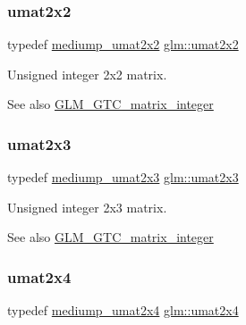 \subsubsection{\texorpdfstring{umat2x2}{umat2x2}}
{\footnotesize\ttfamily typedef \hyperlink{group__gtc__matrix__integer_ga539a528818569c17e68e77afce7755c2}{mediump\+\_\+umat2x2} \hyperlink{group__gtc__matrix__integer_gad3c997b31dd69bdb4787867e758ed48d}{glm\+::umat2x2}}

Unsigned integer 2x2 matrix. \begin{DoxySeeAlso}{See also}
\hyperlink{group__gtc__matrix__integer}{G\+L\+M\+\_\+\+G\+T\+C\+\_\+matrix\+\_\+integer} 
\end{DoxySeeAlso}
\mbox{\label{group__gtc__matrix__integer_ga890ae28f9230794138b2c89f44ce3376}} 
\subsubsection{\texorpdfstring{umat2x3}{umat2x3}}
{\footnotesize\ttfamily typedef \hyperlink{group__gtc__matrix__integer_ga15d2790e10b27b145cd748abffde8968}{mediump\+\_\+umat2x3} \hyperlink{group__gtc__matrix__integer_ga890ae28f9230794138b2c89f44ce3376}{glm\+::umat2x3}}

Unsigned integer 2x3 matrix. \begin{DoxySeeAlso}{See also}
\hyperlink{group__gtc__matrix__integer}{G\+L\+M\+\_\+\+G\+T\+C\+\_\+matrix\+\_\+integer} 
\end{DoxySeeAlso}
\mbox{\label{group__gtc__matrix__integer_ga3b23b164240cf4dfb429776da7be9d88}} 
\subsubsection{\texorpdfstring{umat2x4}{umat2x4}}
{\footnotesize\ttfamily typedef \hyperlink{group__gtc__matrix__integer_gae060f3b73abab278da912329a0a221bc}{mediump\+\_\+umat2x4} \hyperlink{group__gtc__matrix__integer_ga3b23b164240cf4dfb429776da7be9d88}{glm\+::umat2x4}}

